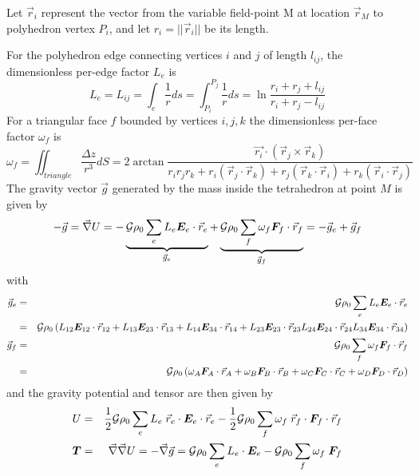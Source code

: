 Let $\vec{r}_i$ represent the vector from the variable 
field-point M at location $\vec{r}_M$ to polyhedron vertex $P_i$, 
and let $r_i = ||\vec{r}_i||$ be its length.


For the polyhedron edge connecting
vertices $i$ and $j$ of length $l_{ij}$, the dimensionless per-edge factor $L_e$ is
\[
L_e=L_{ij} = \int_e \frac{1}{r}ds = \int_{P_i}^{P_j} \frac{1}{r} ds 
= \ln \frac{r_i+r_j+l_{ij}}{r_i+r_j-l_{ij}}
\]
For a triangular face $f$ bounded by vertices $i,j,k$ the dimensionless
per-face factor $\omega_f$ is 
\[
\omega_f = 
\iint_{triangle} \frac{\Delta z}{r^3} dS 
= 2 \arctan \frac{\vec{r_i} \cdot (\vec{r}_j \times \vec{r}_k)}{r_ir_jr_k 
+r_i(\vec{r}_j\cdot\vec{r}_k) 
+r_j(\vec{r}_k\cdot\vec{r}_i) 
+r_k(\vec{r}_i\cdot\vec{r}_j) 
}
\]
The gravity vector $\vec{g}$ generated by the mass inside the tetrahedron 
at point $M$ is given by
\[
-\vec{g} = \vec\nabla U = 
- \underbrace{{\cal G} \rho_0 \sum_e L_e {\bm E}_e\cdot\vec{r}_e}_{\vec{g}_e}
+
\underbrace{{\cal G} \rho_0 \sum_f \omega_f {\bm F}_f\cdot \vec{r}_f}_{\vec{g}_f}
= -\vec{g}_e + \vec{g}_f
\]
with
\begin{eqnarray}
\vec{g}_e 
&=& {\cal G} \rho_0 \sum_e L_e {\bm E}_e \cdot \vec{r}_e \nonumber\\
&=& {\cal G} \rho_0 \left(
L_{12} {\bm E}_{12}\cdot\vec{r}_{12} +
L_{13} {\bm E}_{23}\cdot\vec{r}_{13} +
L_{14} {\bm E}_{34}\cdot\vec{r}_{14} +
L_{23} {\bm E}_{23}\cdot\vec{r}_{23} 
L_{24} {\bm E}_{24}\cdot\vec{r}_{24} 
L_{34} {\bm E}_{34}\cdot\vec{r}_{34} 
\right) \label{eq:tetra:ge}\\
\vec{g}_f
&=& {\cal G} \rho_0 \sum_f \omega_f {\bm F}_f\cdot \vec{r}_f \nonumber\\
&=& {\cal G} \rho_0 \left(
\omega_A {\bm F}_A\cdot \vec{r}_A +
\omega_B {\bm F}_B\cdot \vec{r}_B +
\omega_C {\bm F}_C\cdot \vec{r}_C +
\omega_D {\bm F}_D\cdot \vec{r}_D  
\right) \label{eq:tetra:gf}
\end{eqnarray}
and the gravity potential and tensor are then given by
\begin{eqnarray}
U &=& \frac12 {\cal G} \rho_0  \sum_e  L_e \; \vec{r}_e\cdot{\bm E}_e \cdot \vec{r}_e 
-\frac12 {\cal G} \rho_0 \sum_f \omega_f \; \vec{r}_f \cdot{\bm F}_f \cdot \vec{r}_f  \\
{\bm T} &=&
\vec\nabla\vec\nabla U = -\vec\nabla \vec{g} =
{\cal G} \rho_0 \sum_e 
L_e \cdot{\bm E}_e 
- {\cal G} \rho_0 \sum_f \omega_f \; {\bm F}_f 
\end{eqnarray}



